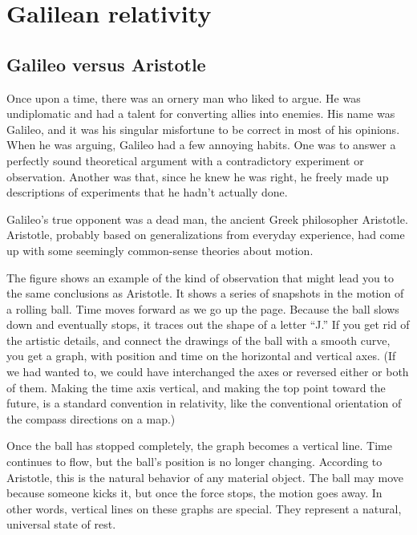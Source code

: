 \chapter{Galilean relativity}

\section{Galileo versus Aristotle}

Once upon a time, there was an ornery man who liked to argue.
He was undiplomatic and had a talent for converting allies into enemies.
His name was Galileo, and it was his singular misfortune to be correct in most of his opinions.
When he was arguing, Galileo had a few annoying habits. One was to answer a perfectly sound theoretical
argument with a contradictory experiment or observation. Another was that, since he
knew he was right, he freely made up descriptions of experiments that he hadn't actually done.

Galileo's true opponent was a dead man, the ancient Greek philosopher Aristotle.
Aristotle, probably based on generalizations from everyday experience, had come up
with some seemingly common-sense theories about motion.

\pagebreak

The figure  shows an example of the kind of observation that might lead you to
the same conclusions as Aristotle. It shows a series of snapshots in the motion
of a rolling ball. Time moves forward as we go up the page.
Because the ball slows down and eventually stops, it traces out the shape of a
letter ``J.'' If you get rid of the artistic details, and connect the drawings of
the ball with a smooth curve, you get a graph, with position and time on the
horizontal and vertical axes. (If we had wanted to, we could have interchanged
the axes or reversed either or both of them. Making the time axis vertical, and
making the top point toward the future, is a standard convention in relativity,
like the conventional orientation of the compass directions on a map.)

Once the ball has stopped completely, the graph becomes a vertical line. Time
continues to flow, but the ball's position is no longer changing. According to
Aristotle, this is the natural behavior of any material object. The ball may move
because someone kicks it, but once the force stops, the motion goes away.
In other words, vertical lines on these graphs are special. They represent a natural, universal
state of rest.


